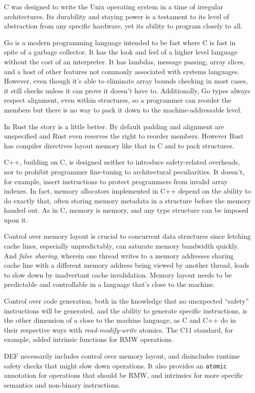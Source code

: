 C was designed to write the Unix operating system in a time of irregular architectures.  Its durability and staying power is a testament to its level of abstraction from any specific hardware, yet its ability to program closely to all.

Go is a modern programming language intended to be fast where C is fast in spite of a garbage collector.\cite{Go}  It has the look and feel of a higher level language without the cost of an interpreter.  It has lambdas, message passing, array slices, and a host of other features not commonly associated with systems languages.  However, even though it's able to eliminate array bounds checking in most cases, it still checks unless it can prove it doesn't have to.  Additionally, Go types always respect alignment, even within structures, so a programmer can reorder the members but there is no way to pack it down to the machine-addressable level.

In Rust the story is a little better. By default padding and alignment are unspecified and Rust even reserves the right to reorder members. However Rust has compiler directives layout memory like that in C and to pack structures.

C++, building on C, is designed neither to introduce safety-related overheads, nor to prohibit programmer fine-tuning to architectural peculiarities.  It doesn't, for example, insert instructions to protect programmers from invalid array indexes.  In fact, memory allocators implemented in C++ depend on the ability to do exactly that, often storing memory metadata in a structure before the memory handed out.\cite{Hoard, TCMalloc, Supermalloc}  As in C, memory is memory, and any type structure can be imposed upon it.

Control over memory layout is crucial to concurrent data structures since fetching cache lines, especially unpredictably, can saturate memory bandwidth quickly.  And \textit{false sharing}, wherein one thread writes to a memory addresses sharing cache line with a different memory address being viewed by another thread, leads to slow down by inadvertant cache invalidation.  Memory layout needs to be predictable and controllable in a language that's close to the machine.

Control over code generation, both in the knowledge that no unexpected ``safety'' instructions will be generated, and the ability to generate specific instructions, is the other dimension of a close to the machine language, as C and C++ do in their respective ways with \textit{read-modify-write} atomics.  The C11 standard, for example, added intrinsic functions for RMW operations.\cite{C11Atomics}

DEF necessarily includes control over memory layout, and disincludes runtime safety checks that might slow down operations.  It also provides an \texttt{atomic} annotation for operations that should be RMW, and intrinsics for more specific semantics and non-binary instructions.
